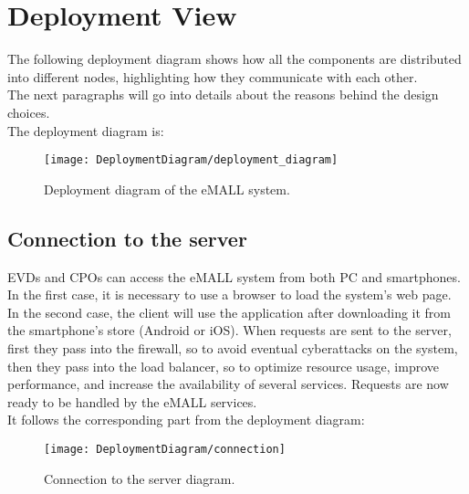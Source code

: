 \newpage


\section{Deployment View}
\label{sec: deployment_view}%
The following deployment diagram shows how all the components are distributed into different nodes,
highlighting how they communicate with each other. \\
The next paragraphs will go into details about the reasons behind the design choices. \\
The deployment diagram is:
\begin{figure} [H]
    \begin{center}
        \texttt{[image: DeploymentDiagram/deployment\_diagram]}
        \caption{Deployment diagram of the eMALL system.}
        \label{fig: depl_diagram}
    \end{center}
\end{figure}

\subsection{Connection to the server}
\label{subsec:connection_to_the_server}%
EVDs and CPOs can access the eMALL system from both PC and smartphones.
In the first case, it is necessary to use a browser to load the system's web page.
In the second case, the client will use the application after downloading it from the smartphone's store (Android or iOS).
When requests are sent to the server, first they pass into the firewall, so to avoid eventual cyberattacks on the system,
then they pass into the load balancer, so to optimize resource usage,
improve performance, and increase the availability of several services.
Requests are now ready to be handled by the eMALL services. \\
It follows the corresponding part from the deployment diagram:
\begin{figure} [H]
    \begin{center}
        \texttt{[image: DeploymentDiagram/connection]}
        \caption{Connection to the server diagram.}
        \label{fig: connection}
    \end{center}
\end{figure}

